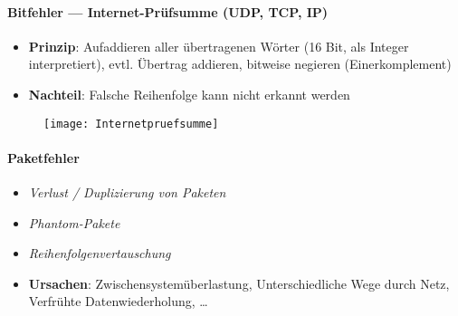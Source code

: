 \paragraph{Bitfehler --- Internet-Prüfsumme (UDP, TCP, IP)}
\begin{itemize}
  \item \textbf{Prinzip}: Aufaddieren aller übertragenen Wörter (16 Bit, als Integer interpretiert), evtl. Übertrag addieren, bitweise negieren (Einerkomplement)
  \item \textbf{Nachteil}: Falsche Reihenfolge kann nicht erkannt werden
\end{itemize}
\begin{figure}[H]\centering\label{Internetpruefsumme}\texttt{[image: Internetpruefsumme]}\end{figure}

\paragraph{Paketfehler}
\begin{itemize}
	\item \emph{Verlust / Duplizierung von Paketen}
	\item \emph{Phantom-Pakete}
	\item \emph{Reihenfolgenvertauschung}
	\item \textbf{Ursachen}: Zwischensystemüberlastung, Unterschiedliche Wege durch Netz, Verfrühte Datenwiederholung, \dots
\end{itemize}

